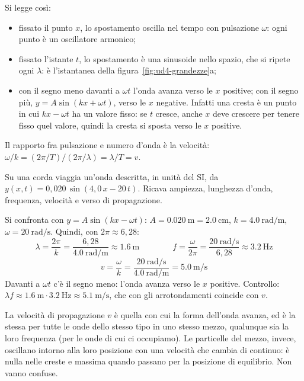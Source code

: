 Si legge così:
\begin{itemize}
  \item fissato il punto $x$, lo spostamento oscilla nel tempo con pulsazione $\omega$: ogni punto è un oscillatore armonico;
  \item fissato l'istante $t$, lo spostamento è una sinusoide nello spazio, che si ripete ogni $\lambda$: è l'istantanea della figura~\ref{fig:ud4-grandezze}a;
  \item con il segno meno davanti a $\omega t$ l'onda avanza verso le $x$ positive; con il segno più, $y = A\sin(kx + \omega t)$, verso le $x$ negative. Infatti una cresta è un punto in cui $kx - \omega t$ ha un valore fisso: se $t$ cresce, anche $x$ deve crescere per tenere fisso quel valore, quindi la cresta si sposta verso le $x$ positive.
\end{itemize}
Il rapporto fra pulsazione e numero d'onda è la velocità: $\omega/k = (2\pi/T)/(2\pi/\lambda) = \lambda/T = v$.

\begin{esempio}
Su una corda viaggia un'onda descritta, in unità del SI, da $y(x,t) = 0{,}020\,\sin(4{,}0\,x - 20\,t)$. Ricava ampiezza, lunghezza d'onda, frequenza, velocità e verso di propagazione.

Si confronta con $y = A\sin(kx - \omega t)$: $A = \SI{0,020}{\metre} = \SI{2,0}{\centi\metre}$, $k = \SI{4,0}{\radian\per\metre}$, $\omega = \SI{20}{\radian\per\second}$. Quindi, con $2\pi \approx 6{,}28$:
\[
  \lambda = \frac{2\pi}{k} = \frac{6{,}28}{\SI{4,0}{\radian\per\metre}} \approx \SI{1,6}{\metre}
  \qquad\qquad
  f = \frac{\omega}{2\pi} = \frac{\SI{20}{\radian\per\second}}{6{,}28} \approx \SI{3,2}{\hertz}
\]
\[
  v = \frac{\omega}{k} = \frac{\SI{20}{\radian\per\second}}{\SI{4,0}{\radian\per\metre}} = \SI{5,0}{\metre\per\second}
\]
Davanti a $\omega t$ c'è il segno meno: l'onda avanza verso le $x$ positive. Controllo: $\lambda f \approx \SI{1,6}{\metre} \cdot \SI{3,2}{\hertz} \approx \SI{5,1}{\metre\per\second}$, che con gli arrotondamenti coincide con $v$.
\end{esempio}

\begin{attenzione}
La velocità di propagazione $v$ è quella con cui la forma dell'onda avanza, ed è la stessa per tutte le onde dello stesso tipo in uno stesso mezzo, qualunque sia la loro frequenza (per le onde di cui ci occupiamo). Le particelle del mezzo, invece, oscillano intorno alla loro posizione con una velocità che cambia di continuo: è nulla nelle creste e massima quando passano per la posizione di equilibrio. Non vanno confuse.
\end{attenzione}

